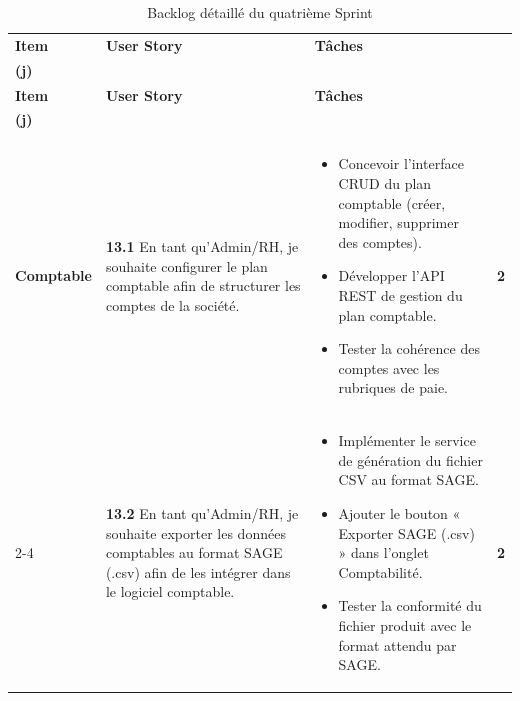 \begin{small}
\renewcommand{\arraystretch}{1.4}
\begin{longtable}{|p{2.8cm}|p{6.2cm}|p{6.2cm}|c|}
\caption{Backlog détaillé du quatrième Sprint}
\label{tab:backlog-sprint4} \\
\hline
\rowcolor[gray]{0.9} \textbf{Item} & \textbf{User Story} & \textbf{Tâches} & \makecell{\textbf{Est.}\\\textbf{(j)}} \\ \hline
\endfirsthead
\hline
\rowcolor[gray]{0.9} \textbf{Item} & \textbf{User Story} & \textbf{Tâches} & \makecell{\textbf{Est.}\\\textbf{(j)}} \\ \hline
\endhead
\hline
\endfoot
\hline
\endlastfoot

\multirow{2}{*}{\makecell[c]{\textbf{Gestion}\\ \textbf{Comptable}}}
& \textbf{13.1} En tant qu'Admin/RH, je souhaite configurer le plan comptable afin de structurer les comptes de la société.
& \begin{itemize}[leftmargin=*, noitemsep, topsep=0pt]
    \item Concevoir l'interface CRUD du plan comptable (créer, modifier, supprimer des comptes).
    \item Développer l'API REST de gestion du plan comptable.
    \item Tester la cohérence des comptes avec les rubriques de paie.
  \end{itemize}
& \textbf{2} \\ \cline{2-4}

& \textbf{13.2} En tant qu'Admin/RH, je souhaite exporter les données comptables au format SAGE (.csv) afin de les intégrer dans le logiciel comptable.
& \begin{itemize}[leftmargin=*, noitemsep, topsep=0pt]
    \item Implémenter le service de génération du fichier CSV au format SAGE.
    \item Ajouter le bouton « Exporter SAGE (.csv) » dans l'onglet Comptabilité.
    \item Tester la conformité du fichier produit avec le format attendu par SAGE.
  \end{itemize}
& \textbf{2} \\ \hline


\end{longtable}
\end{small}
